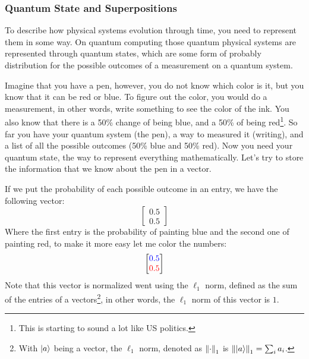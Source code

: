 \subsubsection{Quantum State and Superpositions}
To describe how physical systems evolution through time, you need to represent them in some way. On quantum computing those quantum physical systems are represented through quantum states, which are some form of probably distribution for the possible outcomes of a measurement on a quantum system.

Imagine that you have a pen, however, you do not know which color is it, but you know that it can be red or blue. To figure out the color, you would do a measurement, in other words, write something to see the color of the ink. You also know that there is a 50\% change of being blue, and a 50\% of being red\footnote{This is starting to sound a lot like US politics.}. So far you have your quantum system (the pen), a way to measured it (writing), and a list of all the possible outcomes (50\% blue and 50\% red). Now you need your quantum state, the way to represent everything mathematically. Let's try to store the information that we know about the pen in a vector.

If we put the probability of each possible outcome in an entry, we have the following vector:
$$
\begin{bmatrix}
	0.5 \\
	0.5
\end{bmatrix}
$$
Where the first entry is the probability of painting blue and the second one of painting red, to make it more easy let me color the numbers:
$$
\begin{bmatrix}
	\textcolor{blue}{0.5} \\
	\textcolor{red}{0.5}
\end{bmatrix}
$$
Note that this vector is normalized went using the $\ell_1$ norm, defined as the sum of the entries of a vectors\footnote{With $\ket{a}$ being a vector, the $\ell_1$ norm, denoted as $\norm{\cdot}_1$ is $\norm{\ket{a}}_1 = \sum_i a_i$.}, in other words, the $\ell_1$ norm of this vector is $1$.

